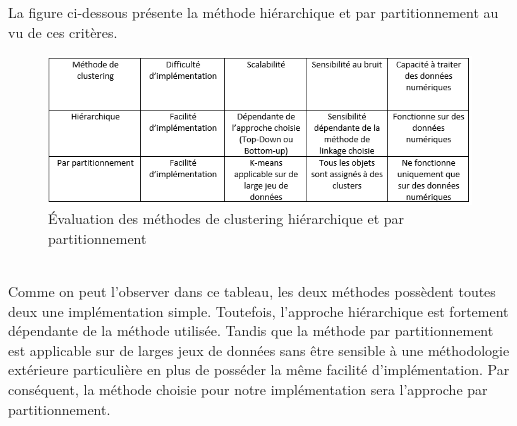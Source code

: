 \documentclass[memoire.tex]{subfiles}
\begin{document}
\newpage
La figure ci-dessous présente la méthode hiérarchique et par partitionnement au vu de ces critères.
	\begin{figure}[h!]
		\centerline{\includegraphics[scale=0.7]{img/comparatif_methodes_2.png}}
		\caption{Évaluation des méthodes de clustering hiérarchique et par partitionnement}
	\end{figure}\\
Comme on peut l'observer dans ce tableau, les deux méthodes possèdent toutes deux une implémentation simple. Toutefois, l'approche hiérarchique est fortement dépendante de la méthode utilisée. Tandis que la méthode par partitionnement est applicable sur de larges jeux de données sans être sensible à une méthodologie extérieure particulière en plus de posséder la même facilité d'implémentation. Par conséquent, la méthode choisie pour notre implémentation sera l'approche par partitionnement.
\end{document}
